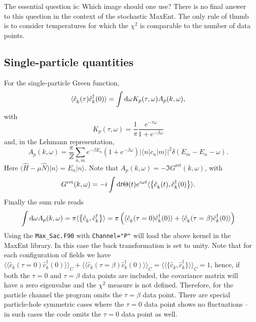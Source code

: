 The essential question is: Which image should one use? There is no final answer to this question in the context of the stochastic MaxEnt. The only rule of thumb is to consider temperatures for which the \( \chi^2 \) is  comparable to the number of data points.


\subsection{Single-particle quantities}
For the single-particle Green function, 
\begin{equation} 
	\langle \hat{c}^{\phantom\dagger}_{k} (\tau)  \hat{c}^{\dagger}_{k} (0)   \rangle   = \int \d \omega  K_p(\tau,\omega)   A_p(k, \omega) ,
\end{equation}
with 
\begin{equation}
K_{p}(\tau,\omega) =    \frac{1}{\pi} \frac{e^{-\tau \omega} }  {  1 + e^{-\beta\omega} }
\end{equation}
and, in the Lehmann representation, 
 \begin{equation}
   A_p(k, \omega) = \frac{ \pi}{Z} \sum_{n,m} e^{-\beta E_n } \left( 1 + e^{-\beta \omega}\right) | \langle n | c_n | m  \rangle |^{2} \delta \left( E_m - E_n - \omega \right)  .
\end{equation}  
Here $ \big( \hat{H} - \mu \hat{N} \big) | n \rangle = E_n | n \rangle  $.
Note that  $ A_p(k, \omega)  = - \Im G^{\mathrm{ret}} (k, \omega) $,  with 
\begin{equation}
	G^{\mathrm{ret}} (k, \omega)  = -i \int \d t \Theta(t)  e^{i \omega t} \langle \big\{ \hat{c}^{\phantom\dagger}_{k} (t), \hat{c}^{\dagger}_{k} (0) \big\} \rangle .
\end{equation}
Finally the sum rule reads
\begin{equation}
	\int \d \omega  A_p(k, \omega)  = \pi \langle  \big\{ \hat{c}^{\phantom\dagger}_{k} , \hat{c}^{\dagger}_{k}  \big\}   \rangle = \pi \left( 
	\langle \hat{c}^{\phantom\dagger}_{k} (\tau=0)  \hat{c}^{\dagger}_{k} (0)   \rangle  +  \langle \hat{c}^{\phantom\dagger}_{k} (\tau=\beta)  \hat{c}^{\dagger}_{k} (0)   \rangle  \right)
\end{equation}
Using the \texttt{Max\_Sac.F90}  with \texttt{Channel="P"}   will  load the above kernel in the MaxEnt library. In this case the back  transformation is set to unity.  
Note that for each  configuration of fields we have $ \langle  \langle \hat{c}^{\phantom\dagger}_{k} (\tau=0)  \hat{c}^{\dagger}_{k} (0)   \rangle  \rangle_{C} +   
\langle \langle \hat{c}^{\phantom\dagger}_{k} (\tau=\beta)  \hat{c}^{\dagger}_{k} (0)   \rangle \rangle_{C} = 
\langle \langle \big\{ \hat{c}^{\phantom\dagger}_{k},   \hat{c}^{\dagger}_{k}    \big\} \rangle \rangle_{C}   = 1$, hence, if both  the $\tau=0$ and $\tau=\beta$ data points are included, the covariance matrix will have a zero eigenvalue and the $\chi^{2}$ measure is not defined. Therefore, for the particle channel the program omits the $\tau=\beta$ data point. There are special  particle-hole symmetric  cases where the $\tau=0$ data point shows no  fluctuations -- in such cases the code omits the $\tau=0$ data point as well.

